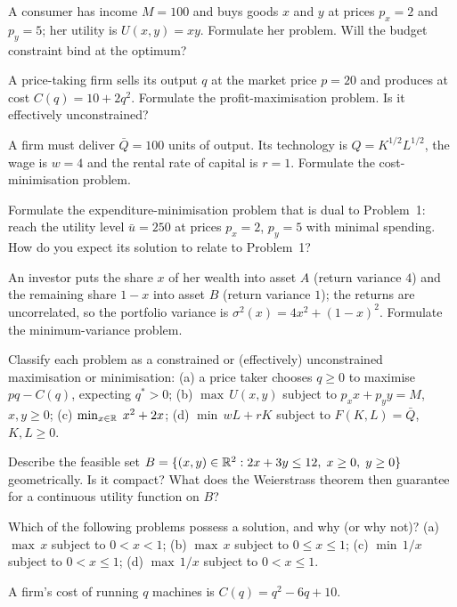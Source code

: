 \begin{problems}
  \item A consumer has income $M=100$ and buys goods $x$ and $y$ at
        prices $p_x=2$ and $p_y=5$; her utility is $U(x,y)=xy$.
        Formulate her problem. Will the budget constraint bind at the
        optimum?
  \item A price-taking firm sells its output $q$ at the market price
        $p=20$ and produces at cost $C(q)=10+2q^{2}$. Formulate the
        profit-maximisation problem. Is it effectively unconstrained?
  \item A firm must deliver $\bar{Q}=100$ units of output. Its
        technology is $Q=K^{1/2}L^{1/2}$, the wage is $w=4$ and the
        rental rate of capital is $r=1$. Formulate the cost-minimisation
        problem.
  \item Formulate the expenditure-minimisation problem that is dual to
        Problem~1: reach the utility level $\bar{u}=250$ at prices
        $p_x=2$, $p_y=5$ with minimal spending. How do you expect its
        solution to relate to Problem~1?
  \item An investor puts the share $x$ of her wealth into asset $A$
        (return variance $4$) and the remaining share $1-x$ into asset
        $B$ (return variance $1$); the returns are uncorrelated, so the
        portfolio variance is $\sigma^{2}(x)=4x^{2}+(1-x)^{2}$.
        Formulate the minimum-variance problem.
  \item Classify each problem as a constrained or (effectively)
        unconstrained maximisation or minimisation:
        (a) a price taker chooses $q\ge 0$ to maximise $pq-C(q)$,
        expecting $q^{*}>0$;
        (b) $\max\, U(x,y)$ subject to $p_x x+p_y y=M$, $x,y\ge 0$;
        (c) $\min_{x\in\mathbb{R}}\; x^{2}+2x$;
        (d) $\min\, wL+rK$ subject to $F(K,L)=\bar{Q}$, $K,L\ge 0$.
  \item Describe the feasible set
        $B=\{(x,y)\in\mathbb{R}^{2} : 2x+3y\le 12,\; x\ge 0,\; y\ge 0\}$
        geometrically. Is it compact? What does the Weierstrass theorem
        then guarantee for a continuous utility function on $B$?
  \item Which of the following problems possess a solution, and why (or
        why not)?
        (a) $\max\, x$ subject to $0<x<1$;
        (b) $\max\, x$ subject to $0\le x\le 1$;
        (c) $\min\, 1/x$ subject to $0<x\le 1$;
        (d) $\max\, 1/x$ subject to $0<x\le 1$.
  \item A firm's cost of running $q$ machines is $C(q)=q^{2}-6q+10$.

\end{problems}

